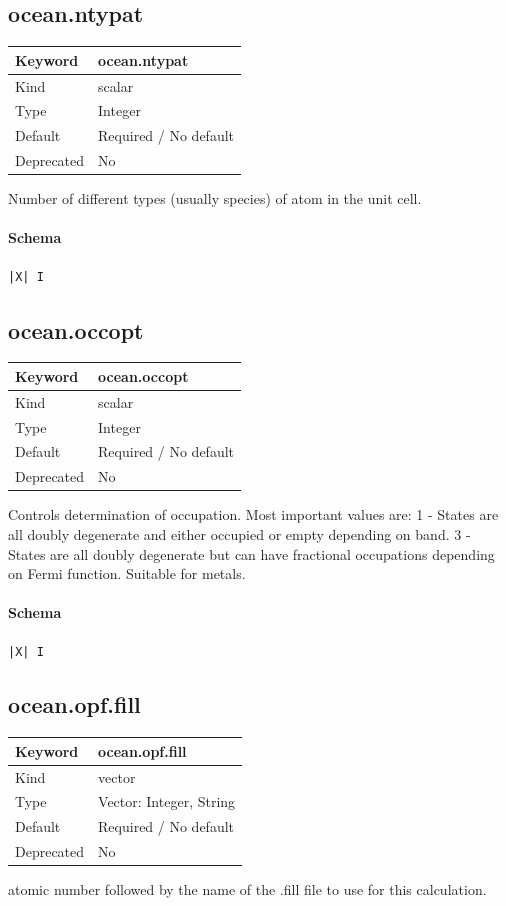 \documentclass[11pt]{article}
\begin{document}
{{{{{\subsection{ocean.ntypat}
\label{kw:ocean-ntypat}
\begin{longtable}{|p{1.5in}|p{4.5in}|}
\hline
Keyword & ocean.ntypat \\
\hline
Kind & scalar \\
\hline
Type & Integer \\
\hline
Default & Required / No default \\
\hline
Deprecated & No \\
\hline
\end{longtable}
 Number of different types (usually species) of atom in the unit cell.

\paragraph{Schema}
\begin{Verbatim}
|X| I
\end{Verbatim}

\subsection{ocean.occopt}
\label{kw:ocean-occopt}
\begin{longtable}{|p{1.5in}|p{4.5in}|}
\hline
Keyword & ocean.occopt \\
\hline
Kind & scalar \\
\hline
Type & Integer \\
\hline
Default & Required / No default \\
\hline
Deprecated & No \\
\hline
\end{longtable}
 Controls determination of occupation. Most important
 values are:
 1 - States are all doubly degenerate and either occupied or empty depending on band.
 3 - States are all doubly degenerate but can have fractional occupations
     depending on Fermi function. Suitable for metals.

\paragraph{Schema}
\begin{Verbatim}
|X| I
\end{Verbatim}

\subsection{ocean.opf.fill}
\label{kw:ocean-opf-fill}
\begin{longtable}{|p{1.5in}|p{4.5in}|}
\hline
Keyword & ocean.opf.fill \\
\hline
Kind & vector \\
\hline
Type & Vector: Integer, String \\
\hline
Default & Required / No default \\
\hline
Deprecated & No \\
\hline
\end{longtable}
 atomic number followed by the name of the .fill file to use for this calculation.

}}}}}
\end{document}
